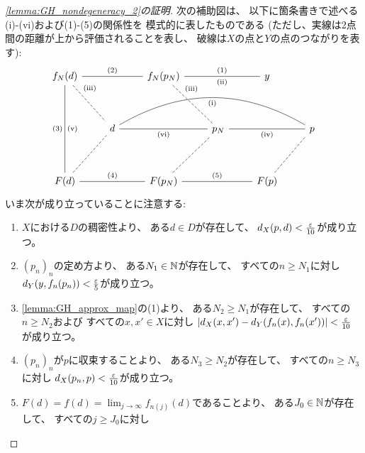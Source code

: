 \documentclass[report, notitlepage]{jlreq}
\begin{document}
\begin{proof}[\cref{lemma:GH_nondegeneracy_2}の証明]
    次の補助図は、
    以下に箇条書きで述べる(i)-(vi)および(1)-(5)の関係性を
    模式的に表したものである
    (ただし、実線は2点間の距離が上から評価されることを表し、
    破線は$X$の点と$Y$の点のつながりを表す):
    \begin{equation}
        \begin{tikzcd}[every arrow/.append style={no head,no tail},row sep=huge]
            f_N(d)
                \ar{rr}{(2)}
                \ar{dd}{\text{(v)}}[swap]{(3)}
                \ar[dashed]{rd}[near start]{\text{(iii)}}
                &&f_N(p_N)
                    \ar{rr}{(1)}[swap]{\text{(ii)}}
                    \ar[dashed]{rd}[near start]{\text{(iii)}}
                &&y
                \\
            &d
                \ar{rr}[swap]{\text{(vi)}}
                \ar[bend left]{rrrr}[swap]{\text{(i)}}
                &&p_N
                    \ar{rr}[swap]{\text{(iv)}}
                &&p
                \\
            F(d)
                \ar{rr}{(4)}
                \ar[dashed]{ru}
                &&F(p_N)
                    \ar{rr}{(5)}
                    \ar[dashed]{ru}
                &&F(p)
                    \ar[dashed]{ru}
        \end{tikzcd}
    \end{equation}
    いま次が成り立っていることに注意する:
    \begin{enumerate}[label=(\roman*)]
        \item $X$における$D$の稠密性より、
            ある$d \in D$が存在して、
            $d_X(p, d) < \frac{\varepsilon}{10}$が成り立つ。
        \item $(p_n)_n$の定め方より、
            ある$N_1 \in \mathbb{N}$が存在して、
            すべての$n \ge N_1$に対し
            $d_Y(y, f_n(p_n)) < \frac{\varepsilon}{5}$が成り立つ。
        \item \cref{lemma:GH_approx_map}の(1)より、
            ある$N_2 \ge N_1$が存在して、
            すべての$n \ge N_2$および
            すべての$x, x' \in X$に対し
            $|d_X(x, x') - d_Y(f_n(x), f_n(x'))| < \frac{\varepsilon}{10}$
            が成り立つ。
        \item $(p_n)_n$が$p$に収束することより、
            ある$N_3 \ge N_2$が存在して、
            すべての$n \ge N_3$に対し
            $d_X(p_n, p) < \frac{\varepsilon}{10}$が成り立つ。
        \item $F(d) = f(d) = \lim_{j \to \infty} f_{n(j)}(d)$であることより、
            ある$J_0 \in \mathbb{N}$が存在して、
            すべての$j \ge J_0$に対し

\end{enumerate}
\end{proof}
\end{document}
